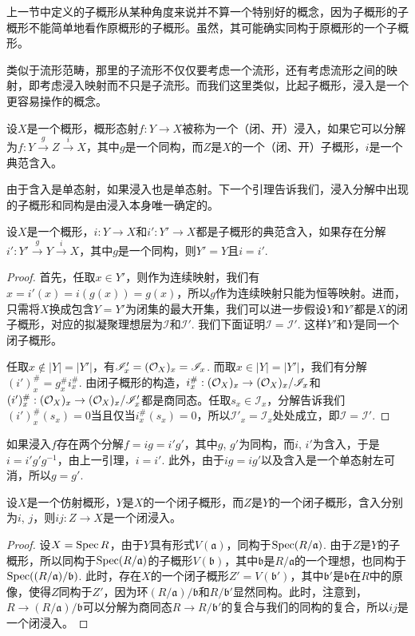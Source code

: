 上一节中定义的子概形从某种角度来说并不算一个特别好的概念，因为子概形的子概形不能简单地看作原概形的子概形。虽然，其可能确实同构于原概形的一个子概形。

类似于流形范畴，那里的子流形不仅仅要考虑一个流形，还有考虑流形之间的映射，即考虑浸入映射而不只是子流形。而我们这里类似，比起子概形，浸入是一个更容易操作的概念。

\begin{para}[浸入]
	设$X$是一个概形，概形态射$f:Y\to X$被称为一个（闭、开）浸入，如果它可以分解为$f:Y\xrightarrow{g}Z\xrightarrow{i} X$，其中$g$是一个同构，而$Z$是$X$的一个（闭、开）子概形，$i$是一个典范含入。
\end{para}

由于含入是单态射，如果浸入也是单态射。下一个引理告诉我们，浸入分解中出现的子概形和同构是由浸入本身唯一确定的。

\begin{lem}
	设$X$是一个概形，$i:Y\to X$和$i':Y'\to X$都是子概形的典范含入，如果存在分解$i':Y'\xrightarrow{g}Y\xrightarrow{i}X$，其中$g$是一个同构，则$Y'=Y$且$i=i'$.
\end{lem}

\begin{proof}
	首先，任取$x\in Y'$，则作为连续映射，我们有$x=i'(x)=i(g(x))=g(x)$，所以$g$作为连续映射只能为恒等映射。进而，只需将$X$换成包含$Y=Y'$为闭集的最大开集，我们可以进一步假设$Y$和$Y'$都是$X$的闭子概形，对应的拟凝聚理想层为$\mathscr I$和$\mathscr I'$. 我们下面证明$\mathscr I=\mathscr I'$. 这样$Y'$和$Y$是同一个闭子概形。

	任取$x\not\in |Y|=|Y'|$，有$\mathscr I'_x=(\mathcal{O}_X)_x=\mathscr I_x$. 而取$x\in |Y|=|Y'|$，我们有分解$(i')^\#_x=g^\#_x i^\#_x$. 由闭子概形的构造，$i^\#_x:(\mathcal{O}_X)_x\to (\mathcal{O}_X)_x/\mathscr I_x$和$(i')^\#_x:(\mathcal{O}_X)_x\to (\mathcal{O}_X)_x/\mathscr I'_x$都是商同态。任取$s_x\in \mathscr I_x$，分解告诉我们$(i')^\#_x(s_x)=0$当且仅当$i^\#_x(s_x)=0$，所以$\mathscr I'_x = \mathscr I_x$处处成立，即$\mathscr I=\mathscr I'$. 
\end{proof}

如果浸入$f$存在两个分解$f=ig=i'g'$，其中$g$, $g'$为同构，而$i$, $i'$为含入，于是$i=i'g'g^{-1}$，由上一引理，$i=i'$. 此外，由于$ig=ig'$以及含入是一个单态射左可消，所以$g=g'$. 

\begin{lem}
设$X$是一个仿射概形，$Y$是$X$的一个闭子概形，而$Z$是$Y$的一个闭子概形，含入分别为$i$, $j$，则$ij:Z\to X$是一个闭浸入。
\end{lem}

\begin{proof}
	设$X=\operatorname{Spec} R$，由于$Y$具有形式$V(\mathfrak a)$，同构于$\operatorname{Spec} (R/\mathfrak a)$. 由于$Z$是$Y$的子概形，所以同构于$\operatorname{Spec} (R/\mathfrak a)$的子概形$V(\mathfrak b)$，其中$\mathfrak b$是$R/\mathfrak a$的一个理想，也同构于$\operatorname{Spec} ((R/\mathfrak a)/\mathfrak b)$. 此时，存在$X$的一个闭子概形$Z'=V(\mathfrak b')$，其中$\mathfrak b'$是$\mathfrak b$在$R$中的原像，使得$Z$同构于$Z'$，因为环$(R/\mathfrak a)/\mathfrak b$和$R/\mathfrak b'$显然同构。此时，注意到，$R\to (R/\mathfrak a)/\mathfrak b$可以分解为商同态$R\to R/\mathfrak b'$的复合与我们的同构的复合，所以$ij$是一个闭浸入。
\end{proof}

